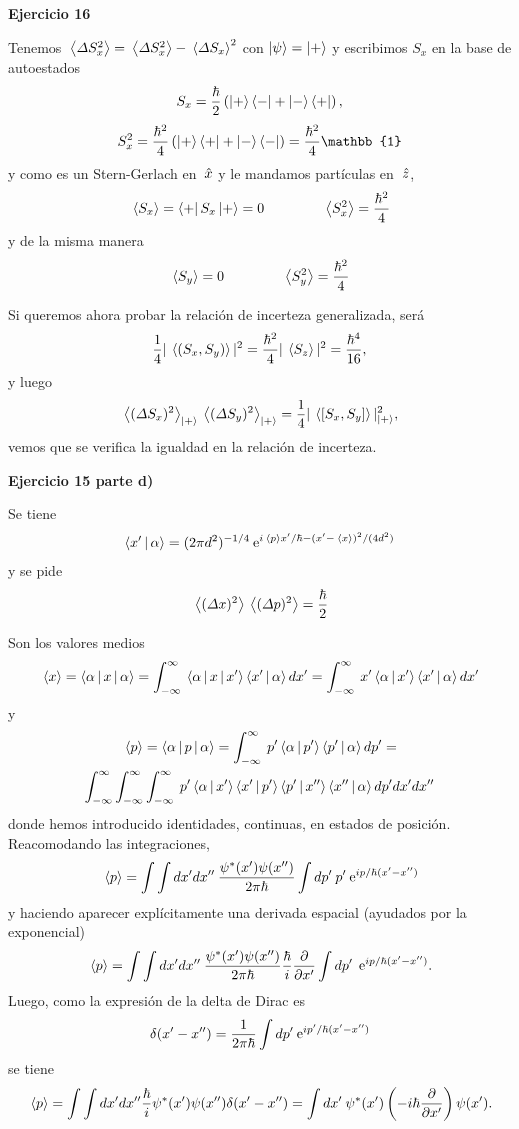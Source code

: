 \documentclass[10pt,oneside]{CBFT_book}
\begin{document}
\begin{ejemplo}{\bf Ejercicio 16}

Tenemos $ \:\left\langle \Delta S_x^2  \right\rangle = \:\left\langle \Delta S_x^2  \right\rangle - \:\left\langle \Delta S_x  \right\rangle^2 $  con $ \Ket{\psi} = \Ket{+} $
y escribimos $S_x$ en la base de autoestados
\[
	S_x = \frac{\hbar}{2} \left( \Ket{+}\Bra{-} + \Ket{-}\Bra{+} \right),
\]
\[
	S_x^2 = \frac{\hbar^2}{4} \left( \KB{+}{+} + \KB{-}{-} \right) = \frac{\hbar^2}{4} \mathbb{1}
\]
y como es un Stern-Gerlach en $\:\hat{x}$ y le mandamos partículas en $\:\hat{z}$,
\[
	\:\left\langle S_x \right\rangle = \Bra{+} S_x \Ket{+} = 0 \qquad \qquad \:\left\langle S_x^2 \right\rangle = \frac{\hbar^2}{4}
\]
y de la misma manera
\[
	\:\left\langle S_y \right\rangle = 0 \qquad \qquad \:\left\langle S_y^2 \right\rangle = \frac{\hbar^2}{4}
\]

Si queremos ahora probar la relación de incerteza generalizada, será
\[
	\frac{1}{4}|\:\left\langle (S_x,S_y) \right\rangle|^2 = \frac{\hbar^2}{4}|\:\left\langle  S_z  \right\rangle|^2 = \frac{\hbar^4}{16},
\]
y luego
\[
	\:\left\langle  (\Delta S_x)^2  \right\rangle_{\Ket{+}} \:\left\langle  (\Delta S_y)^2  \right\rangle_{\Ket{+}} = 
	\frac{1}{4} |\:\left\langle [S_x,S_y] \right\rangle|^2_{\Ket{+}},
\]
vemos que se verifica la igualdad en la relación de incerteza.
 
\end{ejemplo}

\begin{ejemplo}{\bf Ejercicio 15 parte d)}

Se tiene
\[
	\Braket{x'|\alpha} = (2\pi d^2)^{-1/4} \:\mathrm{e}^{i \:\left\langle p \right\rangle x'/\hbar - (x'-\:\left\langle x \right\rangle)^2/(4d^2)}
\]
y se pide
\[
	\:\left\langle (\Delta x)^2 \right\rangle \:\left\langle (\Delta p)^2 \right\rangle = \frac{\hbar}{2}
\]

Son los valores medios
\[
	\:\left\langle x \right\rangle = \Braket{\alpha|x|\alpha} = 
	\int_{-\infty}^\infty \: \Braket{\alpha|x|x'}\Braket{x'|\alpha} dx' =
	\int_{-\infty}^\infty \: x' \Braket{\alpha|x'}\Braket{x'|\alpha} dx'
\]
y
\begin{multline*}
	\:\left\langle p \right\rangle = \Braket{\alpha|p|\alpha} = 
	\int_{-\infty}^\infty \: p' \Braket{\alpha|p'}\Braket{p'|\alpha} dp' = \\
	\int_{-\infty}^\infty \int_{-\infty}^\infty \int_{-\infty}^\infty \: 
	p' \Braket{\alpha|x'}\Braket{x'|p'}\Braket{p'|x''}\Braket{x''|\alpha} dp' dx' dx''
\end{multline*}
donde hemos introducido identidades, continuas, en estados de posición.
Reacomodando las integraciones,
\[
	\:\left\langle p \right\rangle =
	\int \int dx' dx'' \: \frac{\psi^*(x') \psi(x'')}{2\pi\hbar} 
	\int dp' \: p' \:\mathrm{e}^{i p /\hbar (x' - x'')} 
\] 
y haciendo aparecer explícitamente una derivada espacial (ayudados por la exponencial)
\[
	\:\left\langle p \right\rangle =
	\int \int dx' dx'' \: \frac{\psi^*(x') \psi(x'')}{2\pi\hbar} 
	\frac{\hbar}{i} \frac{\partial^{\hspace{-0.05em}} {}}{\partial {x'}^{\hspace{-0.05em}}} \int dp' \: \:\mathrm{e}^{i p /\hbar (x' - x'')}. 
\]
Luego, como la expresión de la delta de Dirac es
\[
	\delta(x'-x'') = \frac{1}{2\pi\hbar} \int dp' \:\mathrm{e}^{i p'/\hbar (x'-x'')}
\]
se tiene
\[
	\:\left\langle p \right\rangle = \int \int dx' dx'' \frac{\hbar}{i} \psi^*(x') \psi(x'') \delta(x'-x'') =
	\int dx' \: \psi^*(x') \left( -i \hbar \frac{\partial^{\hspace{-0.05em}} {}}{\partial {x'}^{\hspace{-0.05em}}} \right) \psi(x').
\]

\end{ejemplo}
\end{document}
